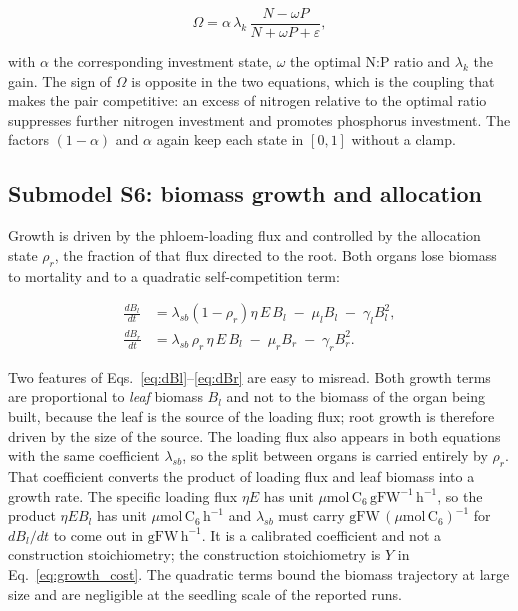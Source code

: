 \begin{equation}
\Omega = \alpha\,\lambda_k\,\frac{N - \omega P}{N + \omega P + \varepsilon},
\label{eq:imbalance}
\end{equation}

with $\alpha$ the corresponding investment state, $\omega$ the optimal N:P ratio
and $\lambda_k$ the gain. The sign of $\Omega$ is opposite in the two equations,
which is the coupling that makes the pair competitive: an excess of nitrogen
relative to the optimal ratio suppresses further nitrogen investment and
promotes phosphorus investment. The factors $(1-\alpha)$ and $\alpha$ again keep
each state in $[0,1]$ without a clamp.

\subsection{Submodel S6: biomass growth and allocation}
\label{sec:allocation}

Growth is driven by the phloem-loading flux and controlled by the allocation
state $\rho_r$, the fraction of that flux directed to the root. Both organs
lose biomass to mortality and to a quadratic self-competition term:

\begin{align}
\frac{dB_l}{dt}
&= \lambda_{sb}\left(1-\rho_r\right)\eta\,E\,B_l
\;-\; \mu_l B_l \;-\; \gamma_l B_l^{2},
\label{eq:dBl}\\[3pt]
\frac{dB_r}{dt}
&= \lambda_{sb}\,\rho_r\,\eta\,E\,B_l
\;-\; \mu_r B_r \;-\; \gamma_r B_r^{2}.
\label{eq:dBr}
\end{align}

Two features of Eqs.~\eqref{eq:dBl}--\eqref{eq:dBr} are easy to misread. Both
growth terms are proportional to \emph{leaf} biomass $B_l$ and not to the
biomass of the organ being built, because the leaf is the source of the loading
flux; root growth is therefore driven by the size of the source. The loading flux
also appears in both equations with the same coefficient $\lambda_{sb}$, so the
split between organs is carried entirely by $\rho_r$. That coefficient converts
the product of loading flux and leaf biomass into a growth rate. The specific
loading flux $\eta E$ has unit $\mu\mathrm{mol\,C_6\,gFW^{-1}\,h^{-1}}$, so the
product $\eta E B_l$ has unit $\mu\mathrm{mol\,C_6\,h^{-1}}$ and
$\lambda_{sb}$ must carry $\mathrm{gFW}\,(\mu\mathrm{mol\,C_6})^{-1}$ for
$dB_l/dt$ to come out in $\mathrm{gFW\,h^{-1}}$. It is a calibrated
coefficient and not a construction stoichiometry; the construction stoichiometry
is $Y$ in Eq.~\eqref{eq:growth_cost}. The quadratic terms bound the biomass
trajectory at large size and are negligible at the seedling scale of the reported
runs.

